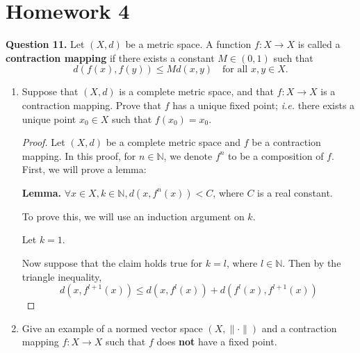 \documentclass{article}
\theoremstyle{plain} %
\numberwithin{thm}{section} %
\theoremstyle{definition}
\begin{document}
    \setcounter{section}{3}
    \section{Homework 4}
    \noindent\textbf{Question 11.} Let $(X,d)$ be a metric space. A function $f:X\rightarrow X$ is called a \textbf{contraction mapping} if there exists a constant $M\in (0,1)$ such that
    \[ d(f(x),f(y))\leq M d(x,y) \quad \text{for all $x,y\in X$.} \]
    \begin{enumerate}[label=(\alph*)]
        \item Suppose that $(X,d)$ is a complete metric space, and that $f:X\rightarrow X$ is a contraction mapping. Prove that $f$ has a unique fixed point; \textit{i.e.} there exists a unique point $x_0\in X$ such that $f(x_0)=x_0$.
        
        \begin{proof}
            Let \((X, d)\) be a complete metric space and \(f\) be a contraction mapping. In this proof, for \(n \in \mathbb{N}\), we denote \(f^n\) to be a composition of \(f\). First, we will prove a lemma:

            \textbf{Lemma.} \(\forall x \in X, k \in \mathbb{N}, d(x, f^n(x)) < C\), where \(C\) is a real constant.

            To prove this, we will use an induction argument on \(k\).

            Let \(k=1\).

            Now suppose that the claim holds true for \(k=l\), where \(l \in \mathbb{N}\). Then by the triangle inequality,
            \[
                d(x, f^{l+1} (x)) \leq d(x, f^l (x)) + d(f^l(x), f^{l+1}(x))
            \]
        \end{proof}

        \item Give an example of a normed vector space $(X,\|\cdot\|)$ and a contraction mapping $f:X\rightarrow X$ such that $f$ does \textbf{not} have a fixed point.
    \end{enumerate}
\end{document}
